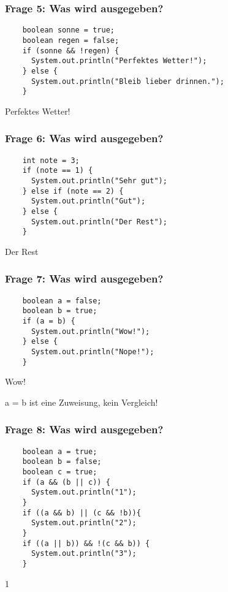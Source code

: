 \documentclass{../../presentation}
\begin{document}
\begin{frame}[fragile]
  \frametitle{Frage 5: Was wird ausgegeben?}
  \begin{verbatim}
    boolean sonne = true;
    boolean regen = false;
    if (sonne && !regen) {
      System.out.println("Perfektes Wetter!");
    } else {
      System.out.println("Bleib lieber drinnen.");
    }
  \end{verbatim}
  \pause
  \begin{ausgabe}
    Perfektes Wetter!
  \end{ausgabe}
\end{frame}

\begin{frame}[fragile]
  \frametitle{Frage 6: Was wird ausgegeben?}
  \begin{verbatim}
    int note = 3;
    if (note == 1) {
      System.out.println("Sehr gut");
    } else if (note == 2) {
      System.out.println("Gut");
    } else {
      System.out.println("Der Rest");
    }
  \end{verbatim}
  \pause
  \begin{ausgabe}
    Der Rest
  \end{ausgabe}
\end{frame}

\begin{frame}[fragile]
  \frametitle{Frage 7: Was wird ausgegeben?}
  \begin{verbatim}
    boolean a = false;
    boolean b = true;
    if (a = b) {
      System.out.println("Wow!");
    } else {
      System.out.println("Nope!");
    }
  \end{verbatim}
  \pause
  \begin{ausgabe}
    Wow!
  \end{ausgabe}
  a = b ist eine Zuweisung, kein Vergleich!\\
\end{frame}

\begin{frame}[fragile]
  \frametitle{Frage 8: Was wird ausgegeben?}
  \begin{verbatim}
    boolean a = true;
    boolean b = false;
    boolean c = true;
    if (a && (b || c)) {
      System.out.println("1");
    }
    if ((a && b) || (c && !b)){
      System.out.println("2");
    } 
    if ((a || b)) && !(c && b)) {
      System.out.println("3");
    }
  \end{verbatim}
  \pause
  \begin{ausgabe}
    1
  \end{ausgabe}
\end{frame}
\end{document}
